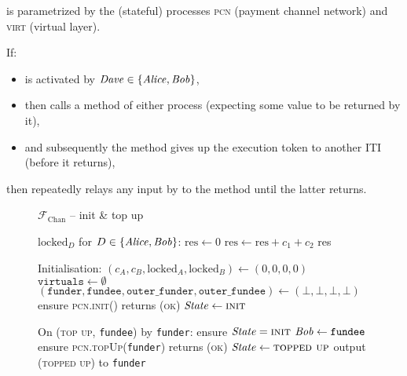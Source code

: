 
\fchan is parametrized by the (stateful) processes \textsc{pcn} (payment channel
network) and \textsc{virt} (virtual layer). 

If:
\begin{itemize}
  \item \fchan is activated by $\mathit{Dave} \in \{\mathit{Alice}, \mathit{Bob}\}$,
  \item \fchan then calls a method of either process (expecting some value to be
  returned by it),
  \item and subsequently the method gives up the execution token to another ITI
  (before it returns),
\end{itemize}
then \fchan repeatedly relays any input by \dave to the method until the latter
returns.

\begin{figure}[H]
  \begin{systembox}{$\mathcal{F}_{\mathrm{Chan}}$ -- init \& top up}
    \begin{algorithmic}[1]
      \State $\mathrm{locked}_D$ for $D \in \{\mathit{Alice}, \mathit{Bob}\}$:
      \Indent
        \State $\mathrm{res} \gets 0$
          \State $\mathrm{res} \gets \mathrm{res} + c_1 + c_2$
        \EndFor
        \State \Return res
      \EndIndent
      \Statex

      \State Initialisation: 
      \Indent
        \State $(c_A, c_B, \mathrm{locked}_A, \mathrm{locked}_B) \gets (0, 0, 0,
        0)$
        \State $\texttt{virtuals} \gets \emptyset$
        \State $(\texttt{funder}, \texttt{fundee}, \texttt{outer\_funder},
        \texttt{outer\_fundee}) \gets (\bot, \bot, \bot, \bot)$
        \State ensure \textsc{pcn.init}() returns (\textsc{ok})
        \State $\mathit{State} \gets \textsc{init}$
      \EndIndent
      \Statex

      \State On (\textsc{top up}, \texttt{fundee}) by \texttt{funder}:
      \label{code:functionality:chan:skeleton:init:top_up:start}
      \Indent
        \State ensure $\mathit{State} = \textsc{init}$
        \State $\mathit{Bob} \gets \texttt{fundee}$
        \State ensure \textsc{pcn.topUp}(\texttt{funder}) returns (\textsc{ok})
        \State $\mathit{State} \gets \textsc{topped up}$
        \State output (\textsc{topped up}) to \texttt{funder}
        \label{code:functionality:chan:skeleton:init:top_up:end}
      \EndIndent
    \end{algorithmic}
  \end{systembox}
  \caption{}
  \label{code:functionality:chan:skeleton:init}
\end{figure}

